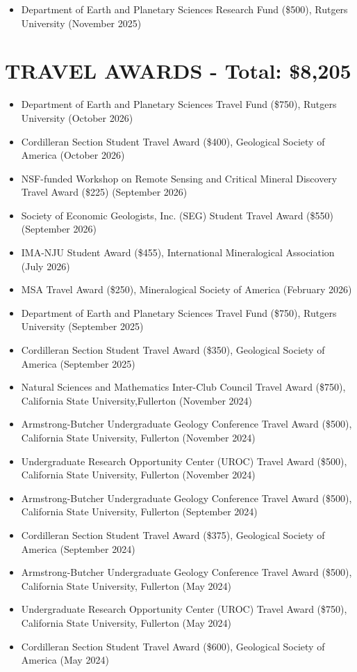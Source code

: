 \documentclass{res} %
\begin{document}
\begin{resume}
\begin{itemize}
  \item Department of Earth and Planetary Sciences Research Fund (\$500), Rutgers University (November 2025)

\end{itemize}

\section{\Large{TRAVEL AWARDS - Total: \$8,205}}

\begin{itemize}
  \item Department of Earth and Planetary Sciences Travel Fund (\$750), Rutgers University (October 2026)
  \item Cordilleran Section Student Travel Award (\$400), Geological Society of America (October 2026)
  \item NSF-funded Workshop on Remote Sensing and Critical Mineral Discovery Travel Award (\$225) (September 2026)
  \item Society of Economic Geologists, Inc. (SEG) Student Travel Award (\$550) (September 2026)
  \item IMA-NJU Student Award (\$455), International Mineralogical Association (July 2026)
  \item MSA Travel Award (\$250), Mineralogical Society of America (February 2026)
  \item Department of Earth and Planetary Sciences Travel Fund (\$750), Rutgers University (September 2025)
  \item Cordilleran Section Student Travel Award (\$350), Geological Society of America (September 2025)
  \item Natural Sciences and Mathematics Inter-Club Council Travel Award (\$750), California State University,Fullerton (November 2024)
  \item Armstrong-Butcher Undergraduate Geology Conference Travel Award (\$500), California State University, Fullerton (November 2024)
  \item Undergraduate Research Opportunity Center (UROC) Travel Award (\$500), California State University, Fullerton (November 2024) 
  \item Armstrong-Butcher Undergraduate Geology Conference Travel Award (\$500), California State University, Fullerton (September 2024) 
  \item Cordilleran Section Student Travel Award (\$375), Geological Society of America (September 2024)
  \item Armstrong-Butcher Undergraduate Geology Conference Travel Award (\$500), California State University, Fullerton (May 2024)
  \item Undergraduate Research Opportunity Center (UROC) Travel Award (\$750), California State  University, Fullerton (May 2024) 
  \item Cordilleran Section Student Travel Award (\$600), Geological Society of America (May 2024)
  

\end{itemize}
\end{resume}
\end{document}
